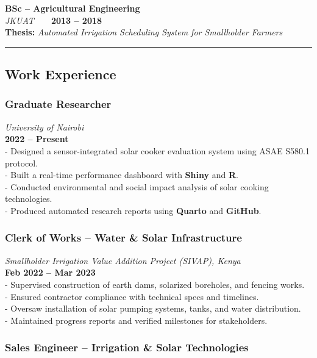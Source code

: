 \documentclass[
  11pt,
]{article}
\begin{document}
\textbf{BSc -- Agricultural Engineering}\\
\emph{JKUAT} \textbar{} \textbf{2013 -- 2018}\\
\textbf{Thesis:} \emph{Automated Irrigation Scheduling System for
Smallholder Farmers}

\begin{center}\rule{0.5\linewidth}{0.5pt}\end{center}

\subsection{Work Experience}\label{work-experience}

\subsubsection{Graduate Researcher}\label{graduate-researcher}

\emph{University of Nairobi}\\
\textbf{2022 -- Present}\\
- Designed a sensor-integrated solar cooker evaluation system using ASAE
S580.1 protocol.\\
- Built a real-time performance dashboard with \textbf{Shiny} and
\textbf{R}.\\
- Conducted environmental and social impact analysis of solar cooking
technologies.\\
- Produced automated research reports using \textbf{Quarto} and
\textbf{GitHub}.

\subsubsection{Clerk of Works -- Water \& Solar
Infrastructure}\label{clerk-of-works-water-solar-infrastructure}

\emph{Smallholder Irrigation Value Addition Project (SIVAP), Kenya}\\
\textbf{Feb 2022 -- Mar 2023}\\
- Supervised construction of earth dams, solarized boreholes, and
fencing works.\\
- Ensured contractor compliance with technical specs and timelines.\\
- Oversaw installation of solar pumping systems, tanks, and water
distribution.\\
- Maintained progress reports and verified milestones for stakeholders.

\subsubsection{Sales Engineer -- Irrigation \& Solar
Technologies}\label{sales-engineer-irrigation-solar-technologies}
\end{document}
